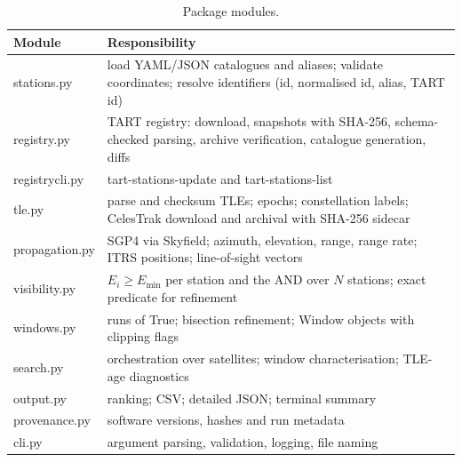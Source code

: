 \documentclass[11pt,a4paper]{article}
\newcommand{\code}[1]{{\ttfamily\def\_{\textunderscore\allowbreak}#1}}
\begin{document}
\begin{table}[h]
\centering
\caption{Package modules.}
\label{tab:modules}
\small
\begin{tabular}{lp{11cm}}
\toprule
Module & Responsibility\\
\midrule
\code{stations.py} & load YAML/JSON catalogues and aliases; validate coordinates; resolve identifiers (id, normalised id, alias, TART id)\\
\code{registry.py} & TART registry: download, snapshots with SHA-256, schema-checked parsing, archive verification, catalogue generation, diffs\\
\code{registry\_cli.py} & \code{tart-stations-update} and \code{tart-stations-list}\\
\code{tle.py} & parse and checksum TLEs; epochs; constellation labels; CelesTrak download and archival with SHA-256 sidecar\\
\code{propagation.py} & SGP4 via Skyfield; azimuth, elevation, range, range rate; ITRS positions; line-of-sight vectors\\
\code{visibility.py} & $E_i\ge E_{\min}$ per station and the AND over $N$ stations; exact predicate for refinement\\
\code{windows.py} & runs of \code{True}; bisection refinement; \code{Window} objects with clipping flags\\
\code{search.py} & orchestration over satellites; window characterisation; TLE-age diagnostics\\
\code{output.py} & ranking; CSV; detailed JSON; terminal summary\\
\code{provenance.py} & software versions, hashes and run metadata\\
\code{cli.py} & argument parsing, validation, logging, file naming\\
\bottomrule
\end{tabular}
\end{table}
\end{document}
